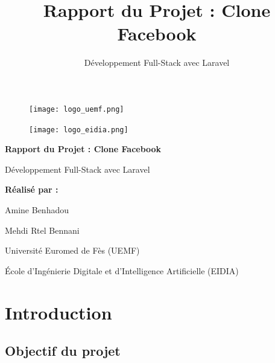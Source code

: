 \documentclass[12pt,a4paper]{article}
\title{\textbf{Rapport du Projet : Clone Facebook}}
\author{D\'eveloppement Full-Stack avec Laravel}
\date{}
\begin{document}
\begin{titlepage}
    \centering
    
    \begin{figure}[h]
        \centering
        \begin{minipage}{0.4\textwidth}
            \centering
            \texttt{[image: logo\_uemf.png]}
        \end{minipage}
        \hfill
        \begin{minipage}{0.4\textwidth}
            \centering
            \texttt{[image: logo\_eidia.png]}
        \end{minipage}
    \end{figure}
    
    \vspace{2cm}
    
    {\LARGE\textbf{Rapport du Projet : Clone Facebook}\par}
    
    \vspace{1cm}
    
    {\large D\'eveloppement Full-Stack avec Laravel\par}
    
    \vspace{3cm}
    
    {\large\textbf{R\'ealis\'e par :}\par}
    \vspace{0.5cm}
    {\large Amine Benhadou\par}
    {\large Mehdi Rtel Bennani\par}
    
    \vfill
    
    {\large Universit\'e Euromed de F\`es (UEMF)\par}
    {\large \'Ecole d'Ing\'enierie Digitale et d'Intelligence Artificielle (EIDIA)\par}
    
\end{titlepage}
\newpage

\tableofcontents
\newpage

\section{Introduction}

\subsection{Objectif du projet}
\end{document}

